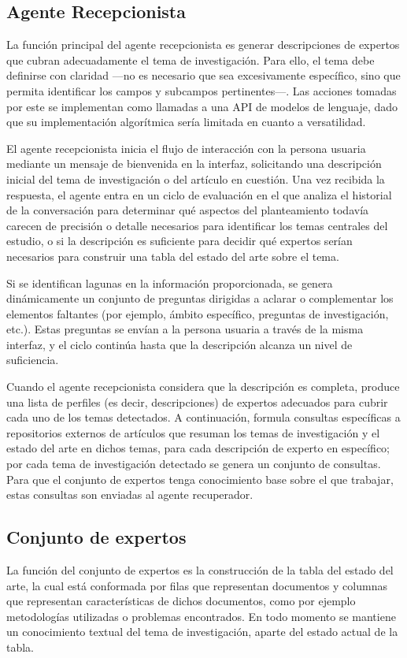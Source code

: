 \documentclass[12pt]{article}
\begin{document}
\subsection{Agente Recepcionista}
La función principal del agente recepcionista es generar descripciones de expertos que cubran adecuadamente el tema de investigación. Para ello, el tema debe definirse con claridad —no es necesario que sea excesivamente específico, sino que permita identificar los campos y subcampos pertinentes—. Las acciones tomadas por este se implementan como llamadas a una API de modelos de lenguaje, dado que su implementación algorítmica sería limitada en cuanto a versatilidad.

El agente recepcionista inicia el flujo de interacción con la persona usuaria mediante un mensaje de bienvenida en la interfaz, solicitando una descripción inicial del tema de investigación o del artículo en cuestión. Una vez recibida la respuesta, el agente entra en un ciclo de evaluación en el que analiza el historial de la conversación para determinar qué aspectos del planteamiento todavía carecen de precisión o detalle necesarios para identificar los temas centrales del estudio, o si la descripción es suficiente para decidir qué expertos serían necesarios para construir una tabla del estado del arte sobre el tema. 

Si se identifican lagunas en la información proporcionada, se genera dinámicamente un conjunto de preguntas dirigidas a aclarar o complementar los elementos faltantes (por ejemplo, ámbito específico, preguntas de investigación, etc.). Estas preguntas se envían a la persona usuaria a través de la misma interfaz, y el ciclo continúa hasta que la descripción alcanza un nivel de suficiencia.

Cuando el agente recepcionista considera que la descripción es completa, produce una lista de perfiles (es decir, descripciones) de expertos adecuados para cubrir cada uno de los temas detectados. A continuación, formula consultas específicas a repositorios externos de artículos que resuman los temas de investigación y el estado del arte en dichos temas, para cada descripción de experto en específico; por cada tema de investigación detectado se genera un conjunto de consultas. Para que el conjunto de expertos tenga conocimiento base sobre el que trabajar, estas consultas son enviadas al agente recuperador.

\subsection{Conjunto de expertos}
La función del conjunto de expertos es la construcción de la tabla del estado del arte, la cual está conformada por filas que representan documentos y columnas que representan características de dichos documentos, como por ejemplo metodologías utilizadas o problemas encontrados. En todo momento se mantiene un conocimiento textual del tema de investigación, aparte del estado actual de la tabla.
\end{document}
